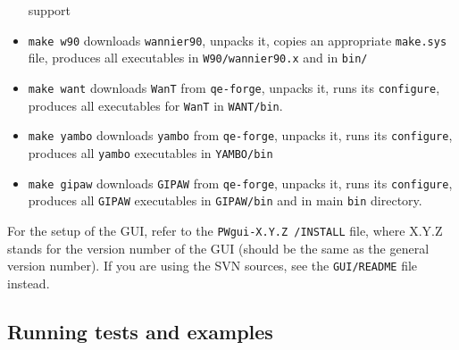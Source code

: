 \documentclass[12pt,a4paper]{article}
\def\configure{\texttt{configure}}
\begin{document}
\begin{itemize}
                           support
\item \texttt{make w90} downloads \texttt{wannier90}, unpacks it, copies an appropriate
                       \texttt{make.sys} file,  produces all executables
                       in \texttt{W90/wannier90.x} and in \texttt{bin/}
\item \texttt{make want} downloads \texttt{WanT} from \texttt{qe-forge}, 
			 unpacks it, runs its \configure,
                         produces all executables for \texttt{WanT} in 
                         \texttt{WANT/bin}.
\item \texttt{make yambo} downloads \texttt{yambo} from \texttt{qe-forge}, 
			  unpacks it, runs its \configure,
                          produces all \texttt{yambo} executables in 
                          \texttt{YAMBO/bin}
\item \texttt{make gipaw} downloads \texttt{GIPAW} from \texttt{qe-forge},
                          unpacks it, runs its \configure,
                          produces all \texttt{GIPAW} executables in 
                          \texttt{GIPAW/bin} and in main \texttt{bin} directory.
\end{itemize}
For the setup of the GUI, refer to the \texttt{PWgui-X.Y.Z /INSTALL} file, where
X.Y.Z stands for the version number of the GUI (should be the same as the
general version number). If you are using the SVN sources, see
the \texttt{GUI/README} file instead.
   
\subsection{Running tests and examples}
\label{SubSec:Examples}

\end{document}
